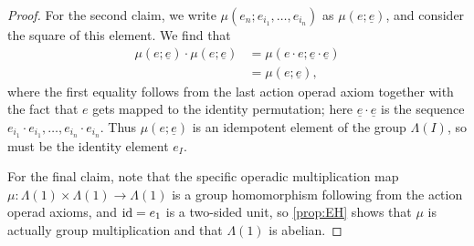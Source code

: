 \begin{proof}
For the second claim, we write $\mu(e_{n}; e_{i_{1}}, \ldots, e_{i_{n}})$ as $\mu(e; \underline{e})$, and consider the square of this element. We find that
  \begin{align*}
    \mu(e; \underline{e}) \cdot \mu(e; \underline{e}) & = \mu(e \cdot e; \underline{e} \cdot \underline{e}) \\
    &= \mu(e; \underline{e}),
  \end{align*}
where the first equality follows from the last action operad axiom together with the fact that $e$ gets mapped to the identity permutation; here $\underline{e} \cdot \underline{e}$ is the sequence $e_{i_{1}} \cdot e_{i_{1}}, \ldots, e_{i_{n}} \cdot e_{i_{n}}$. Thus $\mu(e; \underline{e})$ is an idempotent element of the group $\Lambda(I)$, so must be the identity element $e_{I}$.

For the final claim, note that the specific operadic multiplication map $\mu \colon \Lambda(1) \times \Lambda(1) \rightarrow \Lambda(1)$ is a group homomorphism following from the action operad axioms, and $\textrm{id} = e_{1}$ is a two-sided unit, so \cref{prop:EH} shows that $\mu$ is actually group multiplication and that $\Lambda(1)$ is abelian.
\end{proof}

